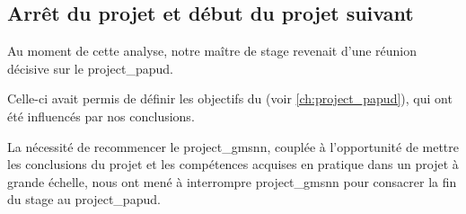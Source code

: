 \subsection{Arrêt du projet et début du projet suivant}
Au moment de cette analyse, notre maître de stage revenait d'une réunion décisive sur le \gls{project_papud}.

Celle-ci avait permis de définir les objectifs du  (voir \autoref{ch:project_papud}), qui ont été influencés par nos conclusions.

La nécessité de recommencer le \gls{project_gmsnn}, couplée à l'opportunité de mettre les conclusions du projet et les compétences acquises en pratique dans un projet à grande échelle, nous ont mené à interrompre \gls{project_gmsnn} pour consacrer la fin du stage au \gls{project_papud}.